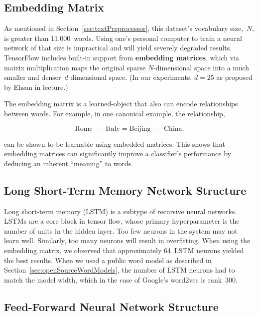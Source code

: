 \documentclass{report}
\begin{document}
  
  \subsection{Embedding Matrix}\label{sec:embeddingMatrix}
  
  As mentioned in Section~\ref{sec:textPreprocessor}, this dataset's vocabulary size,~$N$, is greater than 11,000~words.  Using one's personal computer to train a neural network of that size is impractical and will yield severely degraded results. TensorFlow includes built-in support from \textbf{embedding matrices}, which via matrix multiplication maps the original sparse $N$-dimensional space into a much smaller and denser~$d$ dimensional space. (In our experiments, $d=25$ as proposed by Ehsan in lecture.)  
  
  The embedding matrix is a learned-object that also can encode relationships between words.  For example, in one canonical example, the relationship, 
  
  \[\text{Rome } - \text{ Italy} = \text{Beijing } - \text{ China}\textrm{,}\]
  
  \noindent
  can be shown to be learnable using embedded matrices.  This shows that embedding matrices can significantly improve a classifier's performance by deducing an inherent ``meaning'' to words.
  
  \subsection{Long Short-Term Memory Network Structure}\label{sec:lstemOverview}
  
  Long short-term memory (LSTM) is a subtype of recursive neural networks.  LSTMs are a core block in tensor flow, whose primary hyperparameter is the number of units in the hidden layer.  Too few neurons in the system may not learn well.  Similarly, too many neurons will result in overfitting.  When using the embedding matrix, we observed that approximately 64~LSTM neurons yielded the best results.  When we used a public word model as described in Section~\ref{sec:openSourceWordModels}, the number of LSTM neurons had to match the model width, which in the case of Google's word2vec is rank~300.
  
    
  \subsection{Feed-Forward Neural Network Structure}\label{sec:neuralNetOverview}
  
\end{document}
